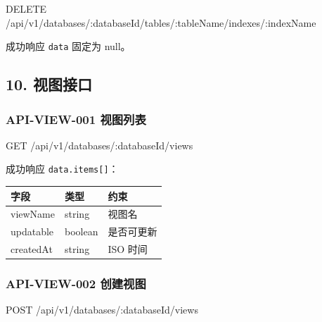 \documentclass[
  a4paper,
  UTF8]{ctexart}
\newenvironment{Shaded}{}{}
\newcommand{\NormalTok}[1]{#1}
\begin{document}
\begin{Shaded}
\begin{Highlighting}[]
\NormalTok{DELETE /api/v1/databases/:databaseId/tables/:tableName/indexes/:indexName}
\end{Highlighting}
\end{Shaded}

成功响应 \texttt{data} 固定为 null。

\hypertarget{ux89c6ux56feux63a5ux53e3}{%
\subsection{10. 视图接口}\label{ux89c6ux56feux63a5ux53e3}}

\hypertarget{api-view-001-ux89c6ux56feux5217ux8868}{%
\subsubsection{API-VIEW-001
视图列表}\label{api-view-001-ux89c6ux56feux5217ux8868}}

\begin{Shaded}
\begin{Highlighting}[]
\NormalTok{GET /api/v1/databases/:databaseId/views}
\end{Highlighting}
\end{Shaded}

成功响应 \texttt{data.items{[}{]}}：

\begin{longtable}[]{@{}lll@{}}
\toprule
字段 & 类型 & 约束 \\
\midrule
\endhead
viewName & string & 视图名 \\
updatable & boolean & 是否可更新 \\
createdAt & string & ISO 时间 \\
\bottomrule
\end{longtable}

\hypertarget{api-view-002-ux521bux5efaux89c6ux56fe}{%
\subsubsection{API-VIEW-002
创建视图}\label{api-view-002-ux521bux5efaux89c6ux56fe}}

\begin{Shaded}
\begin{Highlighting}[]
\NormalTok{POST /api/v1/databases/:databaseId/views}
\end{Highlighting}
\end{Shaded}
\end{document}

